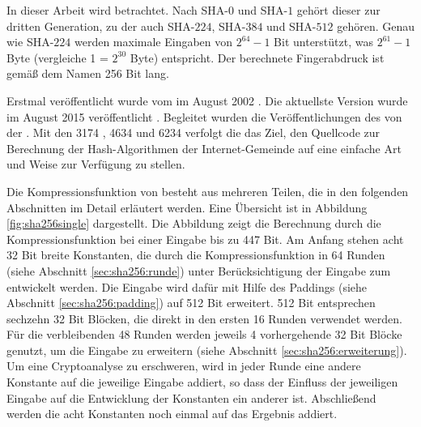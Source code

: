 In dieser Arbeit wird  betrachtet. Nach SHA-$0$ und SHA-$1$ gehört dieser zur dritten Generation, zu der auch SHA-$224$, SHA-$384$ und SHA-$512$ gehören.
Genau wie SHA-$224$ werden maximale Eingaben von $ 2^{64} - 1$ Bit unterstützt, was $ 2^{61} - 1 $ Byte (vergleiche 1  = $ 2^{30} $ Byte) entspricht.
Der berechnete Fingerabdruck ist gemäß dem Namen 256 Bit lang.

Erstmal veröffentlicht wurde  vom  im August 2002 \cite{nist1802}. Die aktuellste Version wurde im August 2015 veröffentlicht \cite{nist1804}.
Begleitet wurden die Veröffentlichungen des  von der . Mit den  3174 \cite{rfc3174}, 4634 \cite{rfc4634} und 6234 \cite{rfc6234}
verfolgt die  das Ziel, den Quellcode zur Berechnung der Hash-Algorithmen der Internet-Gemeinde auf eine einfache Art und Weise zur Verfügung zu stellen.

Die Kompressionsfunktion von  besteht aus mehreren Teilen, die in den folgenden Abschnitten im Detail erläutert werden. Eine Übersicht ist in Abbildung
\ref{fig:sha256single} dargestellt. Die Abbildung zeigt die Berechnung durch die Kompressionsfunktion bei einer Eingabe bis zu 447 Bit. Am Anfang stehen acht
32 Bit breite Konstanten, die durch die Kompressionsfunktion in 64 Runden (siehe Abschnitt \ref{sec:sha256:runde}) unter Berücksichtigung der Eingabe zum 
entwickelt werden. Die Eingabe wird dafür mit Hilfe des Paddings (siehe Abschnitt \ref{sec:sha256:padding}) auf 512 Bit erweitert. 512 Bit entsprechen sechzehn
32 Bit Blöcken, die direkt in den ersten 16 Runden verwendet werden. Für die verbleibenden 48 Runden werden jeweils 4 vorhergehende 32 Bit Blöcke genutzt, um die
Eingabe zu erweitern (siehe Abschnitt \ref{sec:sha256:erweiterung}). Um eine Cryptoanalyse zu erschweren, wird in jeder Runde eine andere Konstante auf die
jeweilige Eingabe addiert, so dass der Einfluss der jeweiligen Eingabe auf die Entwicklung der Konstanten ein anderer ist. Abschließend werden die acht Konstanten
noch einmal auf das Ergebnis addiert.

